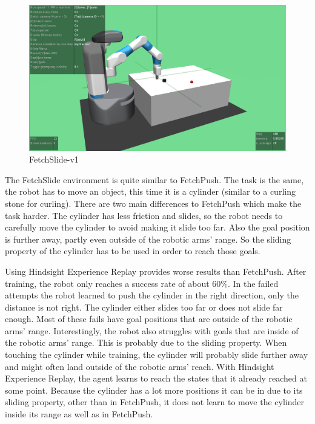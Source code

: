 \begin{figure} [h]
	
	\centering
	\includegraphics[width=1\textwidth]{figures/FetchSlide-v1.png}
	\caption{FetchSlide-v1}
	
\end{figure}

The FetchSlide environment is quite similar to FetchPush. The task is the same, the robot has to move an object, this time it is a cylinder (similar to a curling stone for curling). There are two main differences to FetchPush which make the task harder. The cylinder has less friction and slides, so the robot needs to carefully move the cylinder to avoid making it slide too far. Also the goal position is further away, partly even outside of the robotic arms' range. So the sliding property of the cylinder has to be used in order to reach those goals. 

\vspace{0.5cm}

Using Hindsight Experience Replay provides worse results than FetchPush. After training, the robot only reaches a success rate of about 60\%. 
In the failed attempts the robot learned to push the cylinder in the right direction, only the distance is not right. The cylinder either slides too far or does not slide far enough. Most of these fails have goal positions that are outside of the robotic arms' range. Interestingly, the robot also struggles with goals that are inside of the robotic arms' range. This is probably due to the sliding property. When touching the cylinder while training, the cylinder will probably slide further away and might often land outside of the robotic arms' reach. With Hindsight Experience Replay, the agent learns to reach the states that it already reached at some point. Because the cylinder has a lot more positions it can be in due to its sliding property, other than in FetchPush, it does not learn to move the cylinder inside its range as well as in FetchPush.    


